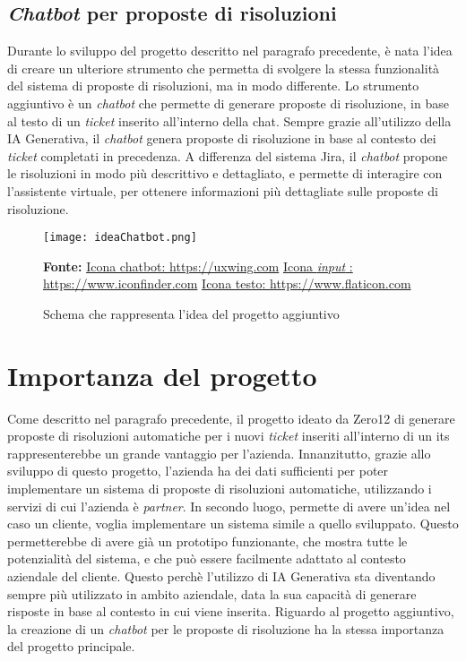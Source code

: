\subsection{\textit{Chatbot} per proposte di risoluzioni}
Durante lo sviluppo del progetto descritto nel paragrafo precedente, è nata l'idea di creare un ulteriore strumento che permetta di svolgere la stessa funzionalità del sistema di proposte di risoluzioni, ma in modo differente. Lo strumento aggiuntivo è un \textit{chatbot} che permette di generare proposte di risoluzione, in base al testo di un \textit{ticket} inserito all'interno della chat. 
Sempre grazie all'utilizzo della IA Generativa, il \textit{chatbot} genera proposte di risoluzione in base al contesto dei \textit{ticket} completati in precedenza. A differenza del sistema Jira, il \textit{chatbot} propone le risoluzioni in modo più descrittivo e dettagliato, e permette di interagire con l'assistente virtuale, per ottenere informazioni più dettagliate sulle proposte di risoluzione.
\begin{figure}[H]
    \centering
    \texttt{[image: ideaChatbot.png]}
    \caption{Schema che rappresenta l'idea del progetto aggiuntivo}
    \label{fig:ideaChatbot}
    \small \textbf{Fonte:} \href{https://uxwing.com/chatbot-icon/}{Icona chatbot: https://uxwing.com} \href{https://www.iconfinder.com/icons/351012/field_input_search_icon}{Icona \textit{input} : https://www.iconfinder.com} \href{https://www.flaticon.com/free-icon/text-file_5116156} {Icona testo: https://www.flaticon.com}

\end{figure}
\section{Importanza del progetto}
Come descritto nel paragrafo precedente, il progetto ideato da Zero12 di generare proposte di risoluzioni automatiche per i nuovi \textit{ticket} inseriti all'interno di un \gls{its} rappresenterebbe un grande vantaggio per l'azienda. Innanzitutto, 
grazie allo sviluppo di questo progetto, l'azienda ha dei dati sufficienti per poter implementare un sistema di proposte di risoluzioni automatiche, utilizzando i servizi di cui l'azienda è \textit{partner}. In secondo luogo, permette di avere un'idea nel 
caso un cliente, voglia implementare un sistema simile a quello sviluppato. Questo permetterebbe di avere già un prototipo funzionante, che mostra tutte le potenzialità del sistema, e che può essere facilmente adattato al contesto aziendale del cliente.
Questo perchè l'utilizzo di IA Generativa sta diventando sempre più utilizzato in ambito aziendale, data la sua capacità di generare risposte in base al contesto in cui viene inserita.
Riguardo al progetto aggiuntivo, la creazione di un \textit{chatbot} per le proposte di risoluzione ha la stessa importanza del progetto principale. 

